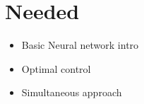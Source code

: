 \section{Needed}

\begin{itemize}
\item
Basic Neural network intro

\item
Optimal control 

\item
Simultaneous approach
\end{itemize}



